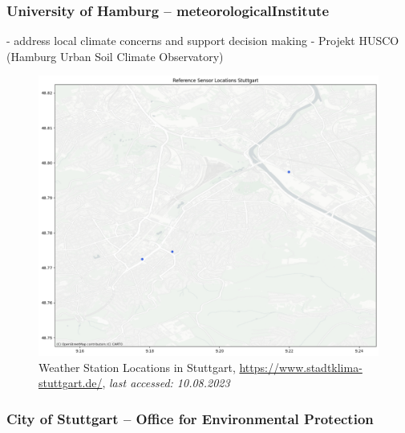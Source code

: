 \subsubsection{University of Hamburg – meteorologicalInstitute}


- address local climate concerns and support decision making
- Projekt HUSCO (Hamburg Urban Soil Climate Observatory)

\begin{figure}[ht]
    \centering
    \includegraphics[width=1\textwidth]{images/afu_stuttgart_sensor_locations.png}
    \caption{Weather Station Locations in Stuttgart, \url{https://www.stadtklima-stuttgart.de/}, \textit{last accessed: 10.08.2023}}
    \label{fig:afu weather station locations}
\end{figure}

\subsubsection{City of Stuttgart – Office for Environmental Protection}

